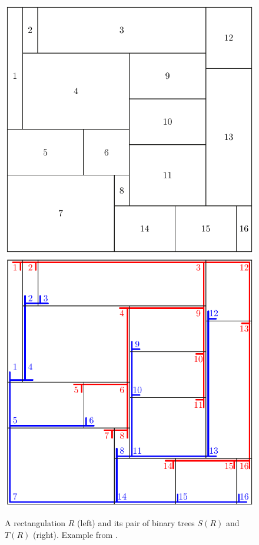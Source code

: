 \documentclass{amsart}
\theoremstyle{definition}
\begin{document}
\begin{figure}
	\centerline{\includegraphics[width=.5\textwidth]{strongRectangulation} \qquad \includegraphics[width=.5\textwidth]{strongRectangulationTrees}}
	\caption{A rectangulation $R$ (left) and its pair of binary trees $S(R)$ and $T(R)$ (right). Example from \cite{ACFF24}.}
        \label{fig:strongRectangulation}
\end{figure}
\end{document}
